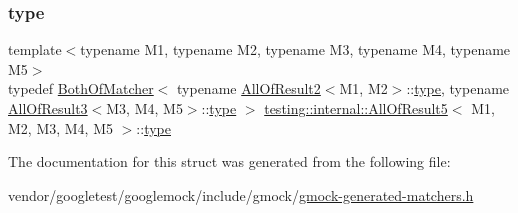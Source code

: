 \subsubsection{\texorpdfstring{type}{type}}
{\footnotesize\ttfamily template$<$typename M1, typename M2, typename M3, typename M4, typename M5$>$ \\
typedef \hyperlink{classtesting_1_1internal_1_1_both_of_matcher}{Both\+Of\+Matcher}$<$ typename \hyperlink{structtesting_1_1internal_1_1_all_of_result2}{All\+Of\+Result2}$<$M1, M2$>$\+::\hyperlink{structtesting_1_1internal_1_1_all_of_result5_aee2e1fb803f428741d147347b692d108}{type}, typename \hyperlink{structtesting_1_1internal_1_1_all_of_result3}{All\+Of\+Result3}$<$M3, M4, M5$>$\+::\hyperlink{structtesting_1_1internal_1_1_all_of_result5_aee2e1fb803f428741d147347b692d108}{type} $>$ \hyperlink{structtesting_1_1internal_1_1_all_of_result5}{testing\+::internal\+::\+All\+Of\+Result5}$<$ M1, M2, M3, M4, M5 $>$\+::\hyperlink{structtesting_1_1internal_1_1_all_of_result5_aee2e1fb803f428741d147347b692d108}{type}}



The documentation for this struct was generated from the following file\+:\begin{DoxyCompactItemize}
\item 
vendor/googletest/googlemock/include/gmock/\hyperlink{gmock-generated-matchers_8h}{gmock-\/generated-\/matchers.\+h}\end{DoxyCompactItemize}
